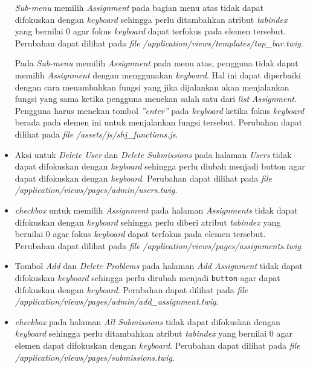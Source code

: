 \begin{itemize}
	\textit{Sub-menu} memilih \textit{Assignment} pada bagian menu atas tidak dapat difokuskan dengan \textit{keyboard} sehingga perlu ditambahkan atribut \textit{tabindex} yang bernilai 0 agar fokus \textit{keyboard} dapat terfokus pada elemen tersebut. Perubahan dapat dilihat pada \textit{file} \textit{/application/views/templates/top\_bar.twig}.

	Pada \textit{Sub-menu} memilih \textit{Assignment} pada menu atas, pengguna tidak dapat memilih \textit{Assignment} dengan menggunakan \textit{keyboard}. Hal ini dapat diperbaiki dengan cara menambahkan fungsi yang jika dijalankan akan menjalankan fungsi yang sama ketika pengguna menekan salah satu dari \textit{list} \textit{Assignment}. Pengguna harus menekan tombol \textit{''enter''} pada \textit{keyboard} ketika fokus \textit{keyboard} berada pada elemen ini untuk menjalankan fungsi tersebut. Perubahan dapat dilihat pada \textit{file} \textit{/assets/js/shj\_functions.js}.
	
	\item Aksi untuk \textit{Delete User} dan \textit{Delete Submissions} pada halaman \textit{Users} tidak dapat difokuskan dengan \textit{keyboard} sehingga perlu diubah menjadi button agar dapat difokuskan dengan \textit{keyboard}. Perubahan dapat dilihat pada \textit{file} \textit{/application/views/pages/admin/users.twig}.

	\item \textit{checkbox} untuk memilih \textit{Assignment} pada halaman \textit{Assignments} tidak dapat difokuskan dengan \textit{keyboard} sehingga perlu diberi atribut \textit{tabindex} yang bernilai 0 agar fokus \textit{keyboard} dapat terfokus pada elemen tersebut. Perubahan dapat dilihat pada \textit{file} \textit{/application/views/pages/assignments.twig}.

	\item Tombol \textit{Add} dan \textit{Delete Problems} pada halaman \textit{Add Assignment} tidak dapat difokuskan \textit{keyboard} sehingga perlu dirubah menjadi \texttt{button} agar dapat difokuskan dengan \textit{keyboard}. Perubahan dapat dilihat pada \textit{file} \textit{/application/views/pages/admin/add\_assignment.twig}.

	\item \textit{checkbox} pada halaman \textit{All Submissions} tidak dapat difokuskan dengan \textit{keyboard} sehingga perlu ditambahkan atribut \textit{tabindex} yang bernilai 0 agar elemen dapat difokuskan dengan \textit{keyboard}. Perubahan dapat dilihat pada \textit{file} \textit{/application/views/pages/submissions.twig}.
	

\end{itemize}
